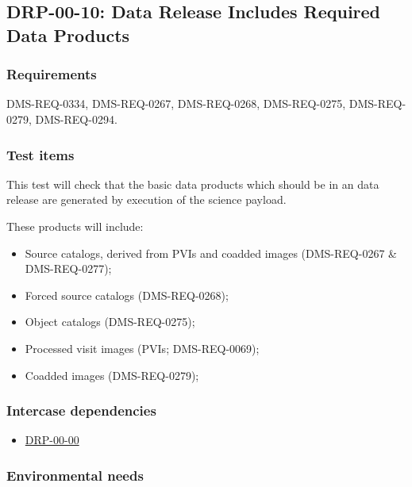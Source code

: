 \subsection{DRP-00-10: Data Release Includes Required Data Products}
\label{drp-00-10}

\subsubsection{Requirements}

DMS-REQ-0334, DMS-REQ-0267, DMS-REQ-0268, DMS-REQ-0275, DMS-REQ-0279,
DMS-REQ-0294.

\subsubsection{Test items}
\label{drp-00-10-items}

This test will check that the basic data products which should be in an data
release are generated by execution of the science payload.

These products will include:

\begin{itemize}

  \item{Source catalogs, derived from PVIs and coadded images (DMS-REQ-0267 \& DMS-REQ-0277);}
  \item{Forced source catalogs (DMS-REQ-0268);}
  \item{Object catalogs (DMS-REQ-0275);}
  \item{Processed visit images (PVIs; DMS-REQ-0069);}
  \item{Coadded images (DMS-REQ-0279);}

\end{itemize}

\subsubsection{Intercase dependencies}

\begin{itemize}

  \item{\hyperref[drp-00-00]{DRP-00-00}}

\end{itemize}

\subsubsection{Environmental needs}

